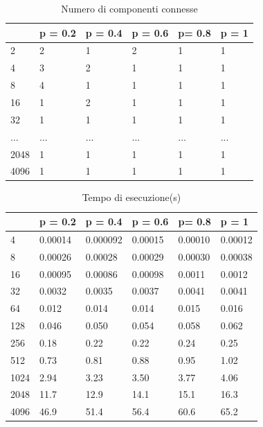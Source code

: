\documentclass[]{article}
\begin{document}
\begin{table}[H]
\centering
\caption{Numero di componenti connesse}
\label{tab:ccs_n}

\begin{tabular}{|l|l|l|l|l|l|} 
\cline{2-6}
\multicolumn{1}{l|}{} & p = 0.2 & p = 0.4 & p = 0.6 & p= 0.8 & p = 1  \\ 
\hline
2                     & 2       & 1       & 2       & 1      & 1      \\
4                     & 3       & 2       & 1       & 1      & 1      \\
8                     & 4       & 1       & 1       & 1      & 1      \\
16                    & 1       & 2       & 1       & 1      & 1      \\
32                    & 1       & 1       & 1       & 1      & 1      \\
...                   & ...     & ...     & ...     & ...    & ...    \\
2048                  & 1       & 1       & 1       & 1      & 1      \\
4096                  & 1       & 1       & 1       & 1      & 1      \\
\hline
\end{tabular}
\end{table}

\begin{table}[H]
\centering
\caption{Tempo di esecuzione(s)}
\label{tab:ccs_time}
\begin{tabular}{|l|l|l|l|l|l|} 
\cline{2-6}
\multicolumn{1}{l|}{} & p = 0.2 & p = 0.4  & p = 0.6 & p= 0.8  & p = 1    \\ 
\hline
4                     & 0.00014 & 0.000092 & 0.00015 & 0.00010 & 0.00012  \\
8                     & 0.00026 & 0.00028  & 0.00029 & 0.00030 & 0.00038  \\
16                    & 0.00095 & 0.00086  & 0.00098 & 0.0011  & 0.0012   \\
32                    & 0.0032  & 0.0035   & 0.0037  & 0.0041  & 0.0041   \\
64                    & 0.012   & 0.014    & 0.014   & 0.015   & 0.016    \\
128                   & 0.046   & 0.050    & 0.054   & 0.058   & 0.062    \\
256                   & 0.18    & 0.22     & 0.22    & 0.24    & 0.25     \\
512                   & 0.73    & 0.81     & 0.88    & 0.95    & 1.02     \\
1024                  & 2.94    & 3.23     & 3.50    & 3.77    & 4.06     \\
2048                  & 11.7    & 12.9     & 14.1    & 15.1    & 16.3     \\
4096                  & 46.9    & 51.4     & 56.4    & 60.6    & 65.2     \\
\hline
\end{tabular}
\end{table}
\end{document}
